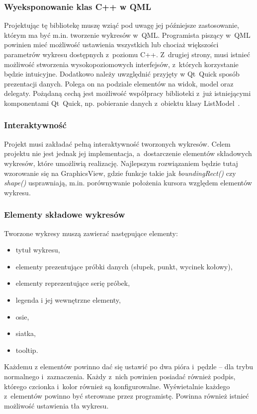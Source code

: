 \documentclass[11pt,twoside,a4paper,final]{article}
\begin{document}
\subsubsection{Wyeksponowanie klas C++ w QML}
Projektując tę bibliotekę muszę wziąć pod uwagę jej późniejsze zastosowanie, którym ma być m.in. tworzenie wykresów w~QML. Programista piszący w~QML powinien mieć możliwość ustawienia wszystkich lub chociaż większości parametrów wykresu dostępnych z~poziomu C++. Z~drugiej strony, musi istnieć możliwość stworzenia wysokopoziomowych interfejsów, z~których korzystanie będzie intuicyjne. Dodatkowo należy uwzględnić przyjęty w Qt~Quick sposób prezentacji danych. Polega on na podziale elementów na widok, model oraz delegaty. Pożądaną cechą jest możliwość współpracy biblioteki z~już istniejącymi komponentami Qt~Quick, np. pobieranie danych z~obiektu klasy ListModel~\cite{list-model}. 

\subsubsection{Interaktywność}
Projekt musi zakładać pełną interaktywność tworzonych wykresów. Celem projektu nie jest jednak jej implementacja, a~dostarczenie elementów składowych wykresów, które umożliwią realizację. Najlepszym rozwiązaniem będzie tutaj wzorowanie się na GraphicsView, gdzie funkcje takie jak \textit{boundingRect()} czy \textit{shape()} usprawniają, m.in. porównywanie położenia kursora względem elementów wykresu.


\subsubsection{Elementy składowe wykresów}
Tworzone wykresy muszą zawierać następujące elementy:
\begin{itemize}
\item{tytuł wykresu,}
\item{elementy prezentujące próbki danych (słupek, punkt, wycinek kołowy),}
\item{elementy reprezentujące serię próbek,}
\item{legenda i jej wewnętrzne elementy,}
\item{osie,}
\item{siatka,}
\item{tooltip.}
\end{itemize}

Każdemu z elementów powinno dać się ustawić po dwa pióra i~pędzle -- dla trybu normalnego i~zaznaczenia. Każdy z~nich powinien posiadać również podpis, którego czcionka i~kolor również są konfigurowalne. Wyświetalnie każdego z~elementów powinno być sterowane przez programistę. Powinna również istnieć możliwość ustawienia tła wykresu.
\end{document}
